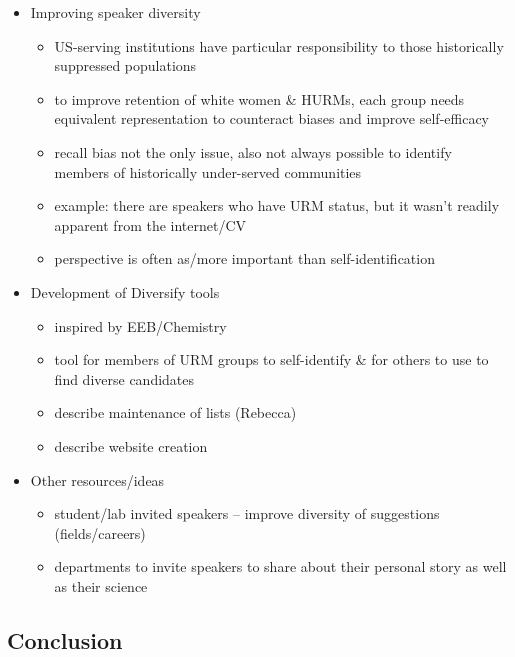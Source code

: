 \documentclass[10pt,]{article}
\providecommand{\tightlist}{%
  \setlength{\itemsep}{0pt}\setlength{\parskip}{0pt}}
\begin{document}
\begin{itemize}
\tightlist
\item
  Improving speaker diversity

  \begin{itemize}
  \tightlist
  \item
    US-serving institutions have particular responsibility to those
    historically suppressed populations
  \item
    to improve retention of white women \& HURMs, each group needs
    equivalent representation to counteract biases and improve
    self-efficacy
  \item
    recall bias not the only issue, also not always possible to identify
    members of historically under-served communities
  \item
    example: there are speakers who have URM status, but it wasn't
    readily apparent from the internet/CV
  \item
    perspective is often as/more important than self-identification
  \end{itemize}
\item
  Development of Diversify tools

  \begin{itemize}
  \tightlist
  \item
    inspired by EEB/Chemistry
  \item
    tool for members of URM groups to self-identify \& for others to use
    to find diverse candidates
  \item
    describe maintenance of lists (Rebecca)
  \item
    describe website creation
  \end{itemize}
\item
  Other resources/ideas

  \begin{itemize}
  \tightlist
  \item
    student/lab invited speakers -- improve diversity of suggestions
    (fields/careers)
  \item
    departments to invite speakers to share about their personal story
    as well as their science
  \end{itemize}
\end{itemize}

\subsection{Conclusion}\label{conclusion}
\end{document}
